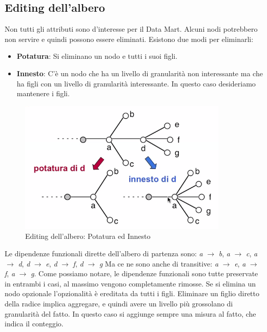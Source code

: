 \subsection{Editing dell'albero}
Non tutti gli attributi sono d'interesse per il Data Mart. Alcuni nodi potrebbero non servire e quindi possono essere eliminati. Esistono due modi per eliminarli:
\begin{itemize}
	\item \textbf{Potatura}: Si eliminano un nodo e tutti i suoi figli.
	\item \textbf{Innesto}: C'è un nodo che ha un livello di granularità non interessante ma che ha figli con un livello di granularità interessante. In questo caso desideriamo mantenere i figli.
\end{itemize}

\begin{figure}[H]
	\begin{center}
		\includegraphics[width=0.4\linewidth]{img/potinnest.PNG}		\caption{Editing dell'albero: Potatura ed Innesto}
	\end{center}
\end{figure}
\noindent Le dipendenze funzionali dirette dell'albero di partenza sono:
\newline
\textit{a} $\xrightarrow{}$ \textit{b}, \textit{a} $\xrightarrow{}$ \textit{c}, \textit{a} $\xrightarrow{}$ \textit{d}, \textit{d} $\xrightarrow{}$ \textit{e}, \textit{d} $\xrightarrow{}$ \textit{f}, \textit{d} $\xrightarrow{}$ \textit{g}\newline
Ma ce ne sono anche di transitive:\newline
\textit{a} $\xrightarrow{}$ \textit{e}, \textit{a} $\xrightarrow{}$ \textit{f}, \textit{a} $\xrightarrow{}$ \textit{g}.\newline
Come possiamo notare, le dipendenze funzionali sono tutte preservate in entrambi i casi, al massimo vengono completamente rimosse.\newline
Se si elimina un nodo opzionale l'opzionalità è ereditata da tutti i figli.\newline
Eliminare un figlio diretto della radice implica aggregare, e quindi avere un livello più grossolano di granularità del fatto. In questo caso si aggiunge sempre una misura al fatto, che indica il conteggio.\newline
